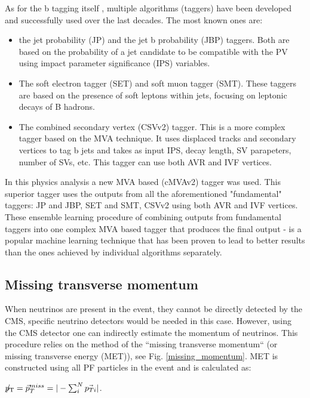 As for the b tagging itself \cite{CMS-PAS-BTV-15-001, Sirunyan:2017ezt}, multiple algorithms (taggers) have been developed and successfully used over the last decades. The most known ones are: 

\begin{itemize}
\item the jet probability (JP) and the jet b probability (JBP) taggers. Both are based on the probability of a jet candidate to be compatible with the PV using impact parameter significance (IPS) variables.
\item The soft electron tagger (SET) and soft muon tagger (SMT). These taggers are based on the presence of soft leptons within jets, focusing on leptonic decays of B hadrons.
\item The combined secondary vertex (CSVv2) tagger. This is a more complex tagger based on the MVA technique. It uses displaced tracks and secondary vertices to tag b jets and takes as input IPS, decay length, SV parapeters, number of SVs, etc. This tagger can use both AVR and IVF vertices.
\end{itemize}

In this physics analysis a new MVA based (cMVAv2) tagger was used. This superior tagger uses the outputs from all the aforementioned "fundamental" taggers: JP and JBP, SET and SMT, CSVv2 using both AVR and IVF vertices. These ensemble learning procedure \cite{ensemble_learning} of combining outputs from fundamental taggers into one complex MVA based tagger that produces the final output - is a popular machine learning technique that has been proven to lead to better results than the ones achieved by individual algorithms separately. 

\subsection{Missing transverse momentum}\label{sec:met}

When neutrinos are present in the event, they cannot be directly detected by the CMS, specific neutrino detectors would be needed in this case. However, using the CMS detector one can indirectly estimate the momentum of neutrinos. This procedure relies on the method of the ``missing  transverse momentum`` \PTslash (or missing transverse energy  \ETslash (MET)), see Fig. \ref{missing_momentum}.  MET is constructed using all PF particles in the event and is calculated as:

${p}_\mathrm{T}\hspace{-1.02em}/\kern 0.5em = \vec{p}^{miss}_T = |- \sum^N_i \vec{p_{Ti}} |$. 




